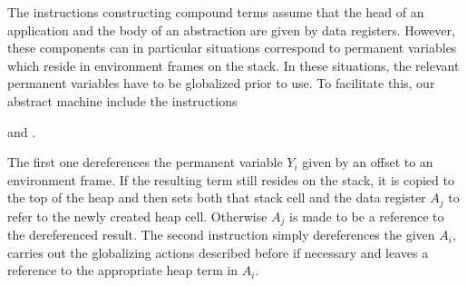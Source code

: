 The instructions constructing compound terms assume that the head of an
application and the body of an abstraction are given by data registers.
However, these components can in particular situations correspond to
permanent variables which reside in environment frames
on the stack. In these situations, the relevant permanent variables have to be
globalized prior to use. To facilitate this,
our abstract machine include the instructions
\begin{tabbing}
 \dquad and .
\end{tabbing}
The first one dereferences the permanent variable $Y_i$ given by an
offset to an environment frame. If the resulting term still resides on the
stack, it is copied to the top of the heap and then sets both that
stack cell and the data register $A_j$ to refer to the newly created
heap cell. Otherwise $A_j$ is made to be a reference to the
dereferenced result.
The second instruction simply dereferences the given
$A_i$, carries out the globalizing actions described before if necessary and
leaves a reference to the appropriate heap term in $A_i$.

